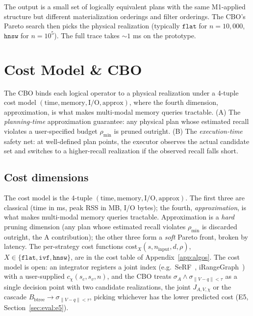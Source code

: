 \documentclass[sigconf]{acmart}
\theoremstyle{plain}
\theoremstyle{definition}
\theoremstyle{remark}
\begin{document}
The output is a small set of logically equivalent plans with the
same M1-applied structure but different materialization orderings
and filter orderings. The CBO's Pareto search then picks the
physical realization (typically $\texttt{flat}$ for $n =
10{,}000$, $\texttt{hnsw}$ for $n = 10^5$). The full trace takes
$\sim 1$ ms on the prototype.

\section{Cost Model \& CBO}\label{sec:cbo}

The CBO binds each logical operator to a physical realization
under a 4-tuple cost model
$(\mathrm{time}, \mathrm{memory}, \mathrm{I/O}, \mathrm{approx})$,
where the fourth dimension, approximation, is what makes
multi-modal memory queries tractable. (A) The \emph{planning-time}
approximation guarantee: any physical plan whose estimated recall
violates a user-specified budget $\rho_{\min}$ is pruned
outright. (B) The \emph{execution-time} safety net: at well-defined
plan points, the executor observes the actual candidate set and
switches to a higher-recall realization if the observed recall
falls short.

\subsection{Cost dimensions}\label{sec:cbo:cost}

The cost model is the 4-tuple
$(\mathrm{time}, \mathrm{memory}, \mathrm{I/O}, \mathrm{approx})$.
The first three are classical (time in ms, peak RSS in MB,
I/O bytes); the fourth, \emph{approximation}, is what makes
multi-modal memory queries tractable. Approximation is a
\emph{hard} pruning dimension (any plan whose estimated
recall violates $\rho_{\min}$ is discarded outright, the A
contribution); the other three form a \emph{soft} Pareto
front, broken by latency. The per-strategy cost functions
$\mathrm{cost}_X(s, n_{\text{input}}, d, \rho)$,
$X \in \{\texttt{flat}, \texttt{ivf}, \texttt{hnsw}\}$, are in
the cost table of Appendix~\ref{app:algos}. The cost model is
open: an integrator registers a joint index (e.g.\
SeRF~\cite{zuo2024serf}, iRangeGraph~\cite{xu2025irangegraph})
with a user-supplied $c_\chi(s_c, s_v, n)$, and the CBO
treats $\sigma_A \wedge \sigma_{\|V-q\|<\tau}$ as a single
decision point with two candidate realizations, the joint
$J_{A,V,\chi}$ or the cascade $B_\mathrm{btree} \to
\sigma_{\|V-q\|<\tau}$, picking whichever has the lower
predicted cost (E5, Section~\ref{sec:eval:e5}).
\end{document}
